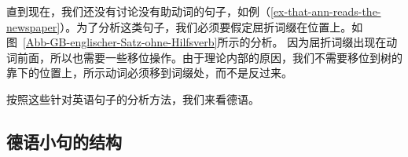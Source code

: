 直到现在，我们还没有讨论没有助动词的句子，如例（\ref{ex-that-ann-reads-the-newspaper}）。为了分析这类句子，我们必须要假定屈折词缀在\inull 位置上。如图~\vref{Abb-GB-englischer-Satz-ohne-Hilfsverb}所示的分析。
因为屈折词缀出现在动词前面，所以也需要一些移位操作。由于理论内部的原因，我们不需要移位到树的靠下的位置上，所示动词必须移到词缀处，而不是反过来。
%

按照这些针对英语句子的分析方法，我们来看德语。


\subsection{德语小句的结构}
\label{sec-German-clause}

